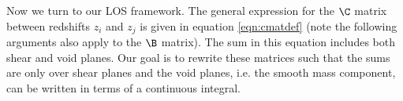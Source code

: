 Now we turn to our LOS framework. The general expression for the $\C$ matrix between redshifts $z_i$ and $z_j$ is given in equation \ref{eqn:cmatdef} (note the following arguments also apply to the $\B$ matrix). The sum in this equation includes both shear and void planes. Our goal is to rewrite these matrices such that the sums are only over shear planes and the void planes, i.e. the smooth mass component, can be written in terms of a continuous integral.  
  
  